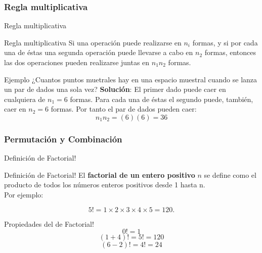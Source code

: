 \documentclass[11pt]{beamer}
\begin{document}
        \subsubsection*{Regla multiplicativa}
          \begin{frame}{Regla multiplicativa}
            \begin{block}{Regla multiplicativa}
                Si una operación puede realizarse en $n_i$ formas, y si por cada una de éstas una segunda operación puede llevarse a cabo en $n_2$ formas, entonces las dos operaciones pueden realizarse juntas en $n_1n_2$ formas.
            \end{block}
            \begin{block}{Ejemplo}
                ¿Cuantos puntos muetrales hay en una espacio muestral cuando se lanza un par de dados una sola vez?
                \pause
                \textbf{Solución}: El primer dado puede caer en cualquiera de $n_1 = 6$ formas. Para cada una de éstas el segundo puede, también, caer en $n_2 = 6$ formas. Por tanto el par de dados pueden caer:
                $$ n_1n_2 = (6)(6) = 36 $$
            \end{block}
          \end{frame}



        \subsubsection*{Permutación y Combinación}
          \begin{frame}{Definición de Factorial!}
            \begin{block}{Definición de Factorial!}
                El \textbf{factorial de un entero positivo} $n$ se define como el producto de todos los números enteros positivos desde 1 hasta n. \\Por ejemplo:

               $$ 5!=1\times 2\times 3\times 4\times 5=120.$$

            \end{block}
            \begin{block}{Propiedades del de Factorial!}
                $$ 0! = 1$$
                $$ (1 + 4)! = 5! = 120$$
                $$ (6 - 2)! = 4! = 24$$

            \end{block}
          \end{frame}
\end{document}
